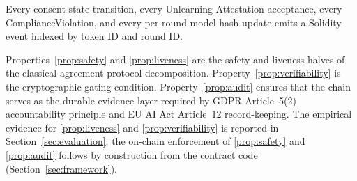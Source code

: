 \begin{property}\label{prop:audit}
Every consent state transition, every Unlearning Attestation
acceptance, every ComplianceViolation, and every per-round model hash
update emits a Solidity event indexed by token ID and round ID.
\end{property}

Properties~\ref{prop:safety} and \ref{prop:liveness} are the safety
and liveness halves of the classical agreement-protocol decomposition.
Property~\ref{prop:verifiability} is the cryptographic gating
condition. Property~\ref{prop:audit} ensures that the chain serves as
the durable evidence layer required by GDPR Article~5(2) accountability
principle and EU AI Act Article~12 record-keeping. The empirical
evidence for \ref{prop:liveness} and \ref{prop:verifiability} is
reported in Section~\ref{sec:evaluation}; the on-chain enforcement of
\ref{prop:safety} and \ref{prop:audit} follows by construction from
the contract code (Section~\ref{sec:framework}).
